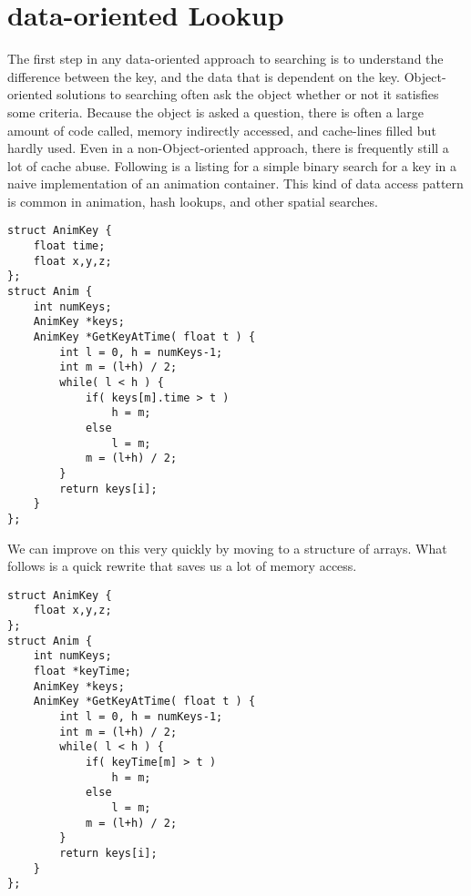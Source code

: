 \section{data-oriented Lookup}

The first step in any data-oriented approach to searching is to understand the
difference between the key, and the data that is dependent on the key.
Object-oriented solutions to searching often ask the object whether or not it
satisfies some criteria. Because the object is asked a question, there is often
a large amount of code called, memory indirectly accessed, and cache-lines
filled but hardly used. Even in a non-Object-oriented approach, there is
frequently still a lot of cache abuse. Following is a listing for a simple
binary search for a key in a naive implementation of an animation container.
This kind of data access pattern is common in animation, hash lookups, and other
spatial searches.

\begin{lstlisting}[caption=Binary search for a given time value]
struct AnimKey {
	float time;
	float x,y,z;
};
struct Anim {
	int numKeys;
	AnimKey *keys;
	AnimKey *GetKeyAtTime( float t ) {
		int l = 0, h = numKeys-1;
		int m = (l+h) / 2;
		while( l < h ) {
			if( keys[m].time > t )
				h = m;
			else
				l = m;
			m = (l+h) / 2;
		}
		return keys[i];
	}
};
\end{lstlisting}

We can improve on this very quickly by moving to a structure of arrays. What
follows is a quick rewrite that saves us a lot of memory access.

\begin{lstlisting}[caption=Binary search for a given time value]
struct AnimKey {
	float x,y,z;
};
struct Anim {
	int numKeys;
	float *keyTime;
	AnimKey *keys;
	AnimKey *GetKeyAtTime( float t ) {
		int l = 0, h = numKeys-1;
		int m = (l+h) / 2;
		while( l < h ) {
			if( keyTime[m] > t )
				h = m;
			else
				l = m;
			m = (l+h) / 2;
		}
		return keys[i];
	}
};
\end{lstlisting}

